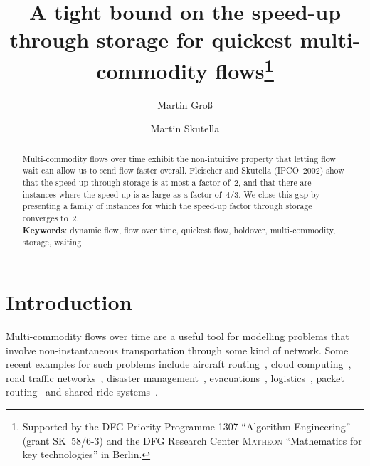 \documentclass[number]{llncs}
\begin{document}
\title{A tight bound on the speed-up through storage for quickest multi-commodity flows\thanks{Supported by the DFG Priority Programme 1307 ``Algorithm Engineering'' (grant SK~58/6-3) and the DFG Research Center \textsc{Matheon} ``Mathematics for key technologies'' in Berlin.} }


\author{Martin Gro\ss{} \and Martin Skutella} 






\maketitle

\begin{abstract}
Multi-commodity flows over time exhibit the non-intuitive property that letting flow wait can allow us to send flow faster overall. Fleischer and Skutella (IPCO~2002) show that the speed-up through storage is at most a factor of~$2$, and that there are instances where the speed-up is as large as a factor of~$4/3$. We close this gap by presenting a family of instances for which the speed-up factor through storage converges to~$2$.\\

\textbf{Keywords}: dynamic flow, flow over time, quickest flow, holdover, multi-commodity, storage, waiting
\end{abstract}

 


\section{Introduction}
 
Multi-commodity flows over time are a useful tool for modelling problems that involve non-instantaneous transportation through some kind of network. Some recent examples for such problems include aircraft routing~\cite{RoyThomlin07}, cloud computing~\cite{AgapiEtAl09,SoudanPrimet09}, road traffic networks~\cite{KoehlerMoehringSkut09}, disaster management~\cite{HanGuanShi11,OsmanEtAl09}, evacuations~\cite{LahmarAssavapokeeArdekani06}, logistics~\cite{AndreattaEtAl09,HernandezPeetaKalafatas11}, packet routing~\cite{PeisWiese11} and shared-ride systems~\cite{BraunWinter09}.
 
\end{document}
